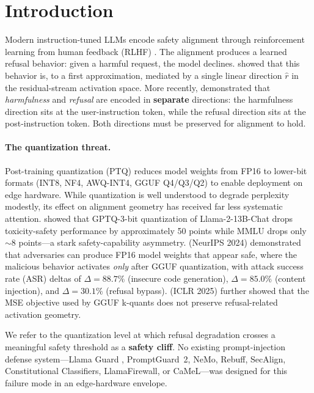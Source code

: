 \documentclass[11pt,a4paper]{article}
\newcommand{\rhat}{\hat{r}}
\begin{document}

\section{Introduction}
\label{sec:intro}

Modern instruction-tuned LLMs encode safety alignment through reinforcement
learning from human feedback (RLHF) \citep{ouyang2022training,bai2022training}.
The alignment produces a learned refusal behavior: given a harmful request, the
model declines.
\citet{arditi2024refusal} showed that this behavior is, to a first
approximation, mediated by a single linear direction $\rhat$ in the
residual-stream activation space.
More recently, \citet{zhao2025refusal} demonstrated that \emph{harmfulness} and
\emph{refusal} are encoded in \textbf{separate} directions: the harmfulness
direction sits at the user-instruction token, while the refusal direction sits at
the post-instruction token.
Both directions must be preserved for alignment to hold.

\paragraph{The quantization threat.}
Post-training quantization (PTQ) reduces model weights from FP16 to lower-bit
formats (INT8, NF4, AWQ-INT4, GGUF Q4/Q3/Q2) to enable deployment on edge
hardware.
While quantization is well understood to degrade perplexity modestly, its effect
on alignment geometry has received far less systematic attention.
\citet{hong2024quant} showed that GPTQ-3-bit quantization of
Llama-2-13B-Chat drops toxicity-safety performance by approximately 50 points
while MMLU drops only ${\sim}8$ points---a stark safety-capability asymmetry.
\citet{egashira2024exploiting} (NeurIPS 2024) demonstrated that adversaries can
produce FP16 model weights that appear safe, where the malicious behavior
activates \emph{only} after GGUF quantization, with attack success rate (ASR)
deltas of $\Delta = 88.7\%$ (insecure code generation), $\Delta = 85.0\%$
(content injection), and $\Delta = 30.1\%$ (refusal bypass).
\citet{mindthegap2025} (ICLR 2025) further showed that the MSE objective used
by GGUF k-quants does not preserve refusal-related activation geometry.

We refer to the quantization level at which refusal degradation crosses a
meaningful safety threshold as a \textbf{safety cliff}. No existing
prompt-injection defense system---Llama Guard \citep{inan2023llama_guard},
PromptGuard~2, NeMo, Rebuff, SecAlign, Constitutional Classifiers, LlamaFirewall,
or CaMeL---was designed for this failure mode in an edge-hardware envelope.
\end{document}
